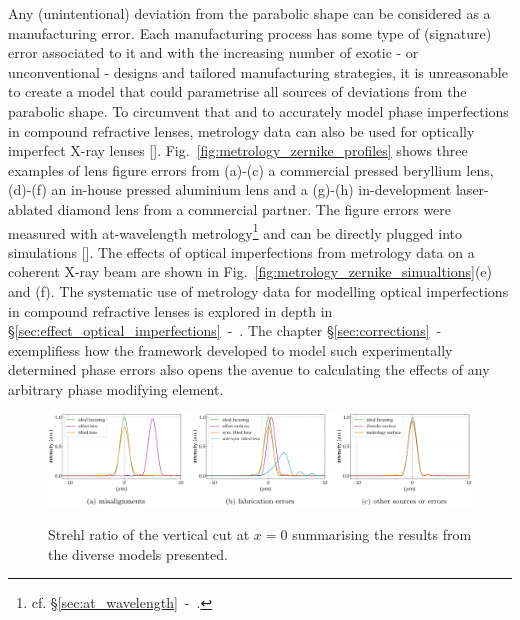 \begin{refsection}
Any (unintentional) deviation from the parabolic shape can be considered as a manufacturing error. Each manufacturing process has some type of (signature) error associated to it and with the increasing number of exotic - or unconventional - designs and tailored manufacturing strategies, it is unreasonable to create a model that could parametrise all sources of deviations from the parabolic shape. To circumvent that and to accurately model phase imperfections in compound refractive lenses, metrology data can also be used for optically imperfect X-ray lenses [\cite{Celestre2020, Chubar2020}]. Fig.~\ref{fig:metrology_zernike_profiles} shows three examples of lens figure errors from (a)-(c) a commercial pressed beryllium lens, (d)-(f) an in-house pressed aluminium lens and a (g)-(h) in-development laser-ablated diamond lens from a commercial partner. The figure errors were measured with at-wavelength metrology\footnote{cf. \S\ref{sec:at_wavelength}~-~\textit{}.} and can be directly plugged into simulations [\cite{Celestre2020}]. The effects of optical imperfections from metrology data on a coherent X-ray beam are shown in Fig.~\ref{fig:metrology_zernike_simualtions}(e) and (f). The systematic use of metrology data for modelling optical imperfections in compound refractive lenses is explored in depth in \S\ref{sec:effect_optical_imperfections}~-~\textit{}. The chapter \S\ref{sec:corrections}~-~\textit{} exemplifiess how the framework developed to model such experimentally determined phase errors also opens the avenue to calculating the effects of any arbitrary phase modifying element.

\begin{figure}[t]
        \centering
        {\includegraphics[width=1.\linewidth]{figures/ch04/Strehl}}
        \caption[Strehl ratio summarising the results from the diverse models presented]{Strehl ratio of the vertical cut at $x=0$ summarising the results from the diverse models presented.} \label{fig:Strehl_m}
\end{figure}

\end{refsection}
